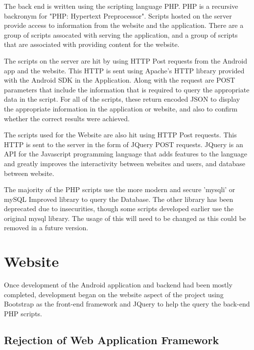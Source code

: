 \documentclass{l4proj}
\begin{document}
The back end is written using the scripting language PHP. PHP is a recursive backronym for "PHP: Hypertext Preprocessor". Scripts hosted on the server provide access to information from the website and the application. There are a group of scripts assocated with serving the application, and a group of scripts that are associated with providing content for the website. 

The scripts on the server are hit by using HTTP Post requests from the Android app and the website. This HTTP is sent using Apache's HTTP library provided with the Android SDK in the Application. Along with the request are POST parameters that include the information that is required to query the appropriate data in the script. For all of the scripts, these return encoded JSON to display the appropriate information in the application or website, and also to confirm whether the correct results were achieved.

The scripts used for the Website are also hit using HTTP Post requests. This HTTP is sent to the server in the form of JQuery POST requests. JQuery is an API for the Javascript programming language that adds features to the language and greatly improves the interactivity between websites and users, and database between website.

The majority of the PHP scripts use the more modern and secure 'mysqli' or mySQL Improved library to query the Database. The other library has been deprecated due to insecurities, though some scripts developed earlier use the original mysql library. The usage of this will need to be changed as this could be removed in a future version.

\section{Website}

Once development of the Android application and backend had been mostly completed, development began on the website aspect of the project using Bootstrap as the front-end framework and JQuery to help the query the back-end PHP scripts.

\subsection{Rejection of Web Application Framework}
\end{document}
